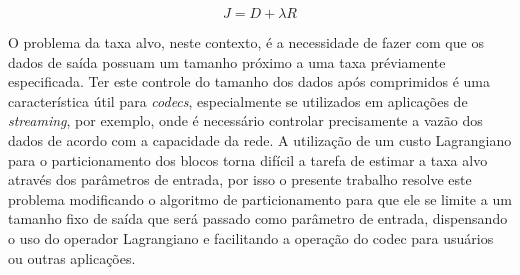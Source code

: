     \begin{equation}
        \label{eqn:lagrangian_cost}
        J = D + \lambda R
    \end{equation}

    O problema da taxa alvo, neste contexto, é a necessidade de fazer com que os dados de saída possuam um tamanho próximo a uma taxa préviamente
    especificada. Ter este controle do tamanho dos dados após comprimidos é uma característica útil para \textit{codecs}, especialmente se utilizados em
    aplicações de \textit{streaming}, por exemplo, onde é necessário controlar precisamente a vazão dos dados de acordo com a capacidade da rede. A utilização
    de um custo Lagrangiano para o particionamento dos blocos torna difícil a tarefa de estimar a taxa alvo através dos parâmetros de entrada, por isso
    o presente trabalho resolve este problema modificando o algoritmo de particionamento para que ele se limite a um tamanho fixo de saída que será 
    passado como parâmetro de entrada, dispensando o uso do operador Lagrangiano e facilitando a operação do codec para usuários ou outras aplicações.









